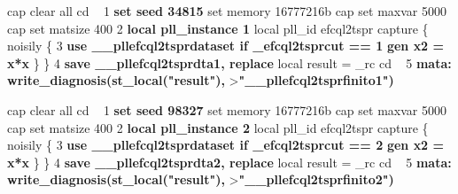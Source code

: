 \def\anchomini{.6\textwidth}
\begin{minipage}[c]{\anchomini}
\begin{semiverbatim}
  cap clear all
  cd ~
1 {\bf{}set seed 34815}
  set memory 16777216b
  cap set maxvar 5000
  cap set matsize 400
2 {\bf{}local pll\_instance 1}
  local pll_id efcql2tspr
  capture \{
  noisily \{
3 {\bf{}use \_\_pllefcql2tsprdataset if \_efcql2tsprcut == 1}
  {\bf{}gen x2 = x*x}
  \}
  \}
4 {\bf{}save \_\_pllefcql2tsprdta1, replace}
  local result = _rc
  cd ~
5 {\bf{}mata: write\_diagnosis(st\_local("result"),}
  >{\bf{}"\_\_pllefcql2tsprfinito1")}
\end{semiverbatim}
\end{minipage}\pause
\begin{minipage}[c]{\anchomini}
\begin{semiverbatim}
  cap clear all
  cd ~
1 {\bf{}set seed 98327}
  set memory 16777216b
  cap set maxvar 5000
  cap set matsize 400
2 {\bf{}local pll\_instance 2}
  local pll_id efcql2tspr
  capture \{
  noisily \{
3 {\bf{}use \_\_pllefcql2tsprdataset if \_efcql2tsprcut == 2}
  {\bf{}gen x2 = x*x}
  \}
  \}
4 {\bf{}save \_\_pllefcql2tsprdta2, replace}
  local result = _rc
  cd ~
5 {\bf{}mata: write\_diagnosis(st\_local("result"),}
  >{\bf{}"\_\_pllefcql2tsprfinito2")}
\end{semiverbatim}
\end{minipage}
